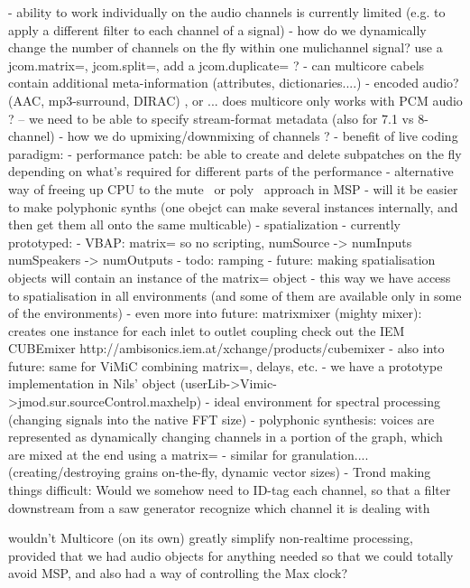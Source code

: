 \documentclass[twoside,a4paper]{article}
\begin{document}
- ability to work individually on the audio channels is currently limited (e.g. to apply a different filter to each channel of a signal)
- how do we dynamically change the number of channels on the fly within one mulichannel signal? use a jcom.matrix=, jcom.split=, add a jcom.duplicate= ? 
- can multicore cabels contain additional meta-information (attributes, dictionaries....)
- encoded audio? (AAC, mp3-surround, DIRAC) , or ... does multicore only works with PCM audio ? -- we need to be able to specify stream-format metadata (also for 7.1 vs 8-channel)
- how we do upmixing/downmixing of channels ? 
- benefit of live coding paradigm:
    - performance patch: be able to create and delete subpatches on the fly depending on what's required for different parts of the performance
    - alternative way of freeing up CPU to the mute~ or poly~ approach in MSP
    - will it be easier to make polyphonic synths (one obejct can make several instances internally, and then get them all onto the same multicable)
    - spatialization - currently prototyped:
        - VBAP: matrix= so no scripting, 
            numSource -> numInputs
            numSpeakers -> numOutputs
        - todo: ramping
        - future: making spatialisation objects will contain an instance of the matrix= object
        - this way we have access to spatialisation in all environments
            (and some of them are available only in some of the environments)
        - even more into future: matrixmixer (mighty mixer): creates one instance for each inlet to outlet coupling
                                    check out the IEM CUBEmixer  http://ambisonics.iem.at/xchange/products/cubemixer
        - also into future: same for ViMiC combining matrix=, delays, etc.
        - we have a prototype implementation in Nils' object (userLib->Vimic->jmod.sur.sourceControl.maxhelp)
        - ideal environment for spectral processing (changing signals into the native FFT size)
    - polyphonic synthesis: voices are represented as dynamically changing channels in a portion of the graph, which are mixed at the end using a matrix=
    - similar for granulation.... (creating/destroying grains on-the-fly, dynamic vector sizes)
        - Trond making things difficult: Would we somehow need to ID-tag each channel, so that a filter downstream from a saw generator recognize which channel it is dealing with

wouldn't Multicore (on its own) greatly simplify non-realtime processing, provided that we had audio objects for anything needed so that we could totally avoid MSP, and also had a way of controlling the Max clock?
\end{document}

